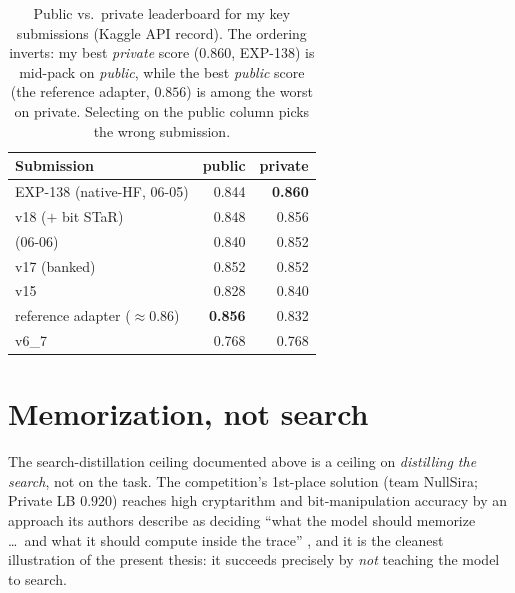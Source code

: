 \documentclass[11pt]{article}
\begin{document}
\begin{table}[htbp]
\centering
\caption{Public vs.\ private leaderboard for my key submissions (Kaggle API record). The
ordering inverts: my best \emph{private} score ($0.860$, EXP-138) is mid-pack on
\emph{public}, while the best \emph{public} score (the reference adapter, $0.856$) is among the
worst on private. Selecting on the public column picks the wrong submission.}
\label{tab:pubpriv}
\small
\begin{tabular}{l r r}
\toprule
Submission & public & private \\
\midrule
EXP-138 (native-HF, 06-05)        & 0.844 & \textbf{0.860} \\
v18 ($+$ bit STaR)                & 0.848 & 0.856 \\
(06-06)                           & 0.840 & 0.852 \\
v17 (banked)                      & 0.852 & 0.852 \\
v15                               & 0.828 & 0.840 \\
reference adapter ($\approx$0.86) & \textbf{0.856} & 0.832 \\
v6\_7                             & 0.768 & 0.768 \\
\bottomrule
\end{tabular}
\end{table}

\section{Memorization, not search}
\label{sec:memo}

The search-distillation ceiling documented above is a ceiling on \emph{distilling the search},
not on the task. The competition's 1st-place solution (team NullSira; Private LB $0.920$) reaches high
cryptarithm and bit-manipulation accuracy by an approach its authors describe as deciding
``what the model should memorize \dots\ and what it should compute inside the trace''
\citep{goodmeatday2026first}, and it is the cleanest illustration of the present thesis: it
succeeds precisely by \emph{not} teaching the model to search.
\end{document}
